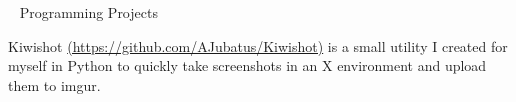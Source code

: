 

\begin{cventries}

%
	\cventry
	{~}
	{Programming Projects}
	{}
	{}
	{
		\begin{cvitems}
		\item {Kiwishot \href{https://github.com/AJubatus/Kiwishot}{(https://github.com/AJubatus/Kiwishot)} is a small utility I created for myself in Python to quickly take screenshots in an X environment and upload them to imgur.}
		\end{cvitems}
		}


\end{cventries}

